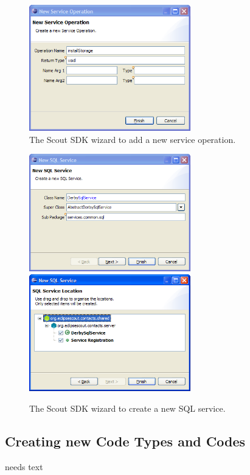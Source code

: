 \documentclass[a4paper,10pt,twoside]{book}
\begin{document}
\begin{figure}
\includegraphics[width=7cm]{wizard_service_operation.png}
\caption{The Scout SDK wizard to add a new service operation.}
\end{figure}

\begin{figure}
\includegraphics[width=7cm]{wizard_service_sql_1.png} \hspace{5mm}
\includegraphics[width=7cm]{wizard_service_sql_2.png}
\caption{The Scout SDK wizard to create a new SQL service.}
\end{figure}

\subsection{Creating new Code Types and Codes}
needs text
\end{document}
